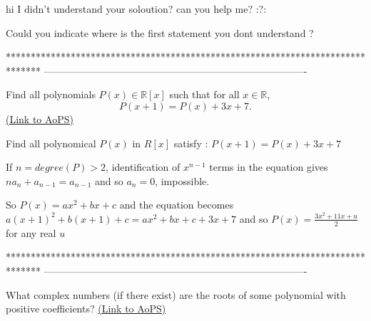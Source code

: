 \begin{solution}
	\begin{tcolorbox}hi
I didn't understand your soloution?
can you help me?
 :?:\end{tcolorbox}

Could you indicate where is the first statement you dont understand ?
\end{solution}
*******************************************************************************
-------------------------------------------------------------------------------

\begin{problem}
	Find all polynomials $ P(x)\in \mathbb R[x]$ such that for all $x \in \mathbb R$, 
\[ P(x+1)=P(x)+3x + 7.\]
	\flushright \href{https://artofproblemsolving.com/community/c6h326957}{(Link to AoPS)}
\end{problem}



\begin{solution}
	\begin{tcolorbox}Find all polynomical $ P(x)$ in $ R[x]$ satisfy : 
  $ P(x + 1) = P(x) + 3x + 7$\end{tcolorbox}

If $ n=degree(P)>2$, identification of $ x^{n-1}$ terms in the equation gives $ na_n+a_{n-1}=a_{n-1}$ and so $ a_n=0$, impossible.

So $ P(x)=ax^2+bx+c$ and the equation becomes $ a(x+1)^2+b(x+1)+c=ax^2+bx+c+3x+7$ and so $ \boxed{P(x)=\frac{3x^2+11x+u}2}$ for any real $ u$
\end{solution}
*******************************************************************************
-------------------------------------------------------------------------------

\begin{problem}
	What complex numbers (if there exist) are the roots of some polynomial with positive coefficients?
	\flushright \href{https://artofproblemsolving.com/community/c6h327086}{(Link to AoPS)}
\end{problem}



